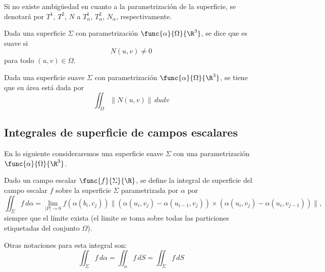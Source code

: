 \documentclass[a4,11pt]{aleph-notas}
\begin{document}
\begin{advertencia}
    Si no existe ambigüedad en cuanto a la parametrización de la superficie, se denotará por $T^1$, $T^2$, $N$ a $T_\alpha^1$, $T_\alpha^2$, $N_\alpha$, respectivamente.
\end{advertencia}
 
\begin{defi}
    Dada una superficie $\Sigma$ con parametrización $\func{\alpha}{\Omega}{\R^3}$, se dice que es suave si
    \[
        N(u,v) \neq 0
    \]
    para todo $(u,v)\in \Omega$.
\end{defi}

\begin{prop}
    Dada una superficie suave $\Sigma$ con parametrización $\func{\alpha}{\Omega}{\R^3}$, se tiene que su área está dada por
    \[
        \iint_\Omega \|N(u,v)\| \,dudv
    \]
\end{prop}


\subsection{Integrales de superficie de campos escalares}


En lo siguiente consideraremos una superficie suave $\Sigma$ con una parametrización $\func{\alpha}{\Omega}{\R^3}$.


\begin{defi}
    Dado un campo escalar $\func{f}{\Sigma}{\R}$, se define la integral de superficie del campo escalar $f$ sobre la superficie $\Sigma$ parametrizada por $\alpha$ por
    \[
        \iint_\Sigma f\, d\alpha 
        = \lim_{|P|\to 0} f(\alpha(b_i,c_j)) \| (\alpha(u_i,v_j)- \alpha(u_{i-1},v_j)) \times (\alpha(u_i,v_j)- \alpha(u_i,v_{j-1}))\|,
    \]
    siempre que el límite exista (el limite se toma sobre todas las particiones etiquetadas del conjunto $\Omega$).
\end{defi}

\begin{advertencia}
    Otras notaciones para esta integral son:
    \[
        \iint_\Sigma f\, d\alpha
        = \iint_\alpha f\, dS
        = \iint_\Sigma f \,dS
    \]
\end{advertencia}
 
\end{document}
